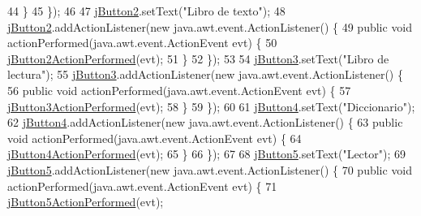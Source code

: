 \begin{DoxyCode}
44             \}
45         \});
46 
47         \mbox{\hyperlink{class_interfaz_package_1_1_interfaz_alta_a1657bb8744ea591f1eb9e70c5c570169}{jButton2}}.setText(\textcolor{stringliteral}{"Libro de texto"});
48         \mbox{\hyperlink{class_interfaz_package_1_1_interfaz_alta_a1657bb8744ea591f1eb9e70c5c570169}{jButton2}}.addActionListener(\textcolor{keyword}{new} java.awt.event.ActionListener() \{
49             \textcolor{keyword}{public} \textcolor{keywordtype}{void} actionPerformed(java.awt.event.ActionEvent evt) \{
50                 \mbox{\hyperlink{class_interfaz_package_1_1_interfaz_alta_ae07fdac3530bdd87b8a2c9ca7705ea61}{jButton2ActionPerformed}}(evt);
51             \}
52         \});
53 
54         \mbox{\hyperlink{class_interfaz_package_1_1_interfaz_alta_a2bce273c449eda774b687351d594071c}{jButton3}}.setText(\textcolor{stringliteral}{"Libro de lectura"});
55         \mbox{\hyperlink{class_interfaz_package_1_1_interfaz_alta_a2bce273c449eda774b687351d594071c}{jButton3}}.addActionListener(\textcolor{keyword}{new} java.awt.event.ActionListener() \{
56             \textcolor{keyword}{public} \textcolor{keywordtype}{void} actionPerformed(java.awt.event.ActionEvent evt) \{
57                 \mbox{\hyperlink{class_interfaz_package_1_1_interfaz_alta_a2f5ffffe991863a26854f54c1f62dbad}{jButton3ActionPerformed}}(evt);
58             \}
59         \});
60 
61         \mbox{\hyperlink{class_interfaz_package_1_1_interfaz_alta_a1766bf9cf73dcb04fa55a88750a864f5}{jButton4}}.setText(\textcolor{stringliteral}{"Diccionario"});
62         \mbox{\hyperlink{class_interfaz_package_1_1_interfaz_alta_a1766bf9cf73dcb04fa55a88750a864f5}{jButton4}}.addActionListener(\textcolor{keyword}{new} java.awt.event.ActionListener() \{
63             \textcolor{keyword}{public} \textcolor{keywordtype}{void} actionPerformed(java.awt.event.ActionEvent evt) \{
64                 \mbox{\hyperlink{class_interfaz_package_1_1_interfaz_alta_a11278134da20d54ada1b395cba82595a}{jButton4ActionPerformed}}(evt);
65             \}
66         \});
67 
68         \mbox{\hyperlink{class_interfaz_package_1_1_interfaz_alta_a368946c13229a442a7633f37c8fa0425}{jButton5}}.setText(\textcolor{stringliteral}{"Lector"});
69         \mbox{\hyperlink{class_interfaz_package_1_1_interfaz_alta_a368946c13229a442a7633f37c8fa0425}{jButton5}}.addActionListener(\textcolor{keyword}{new} java.awt.event.ActionListener() \{
70             \textcolor{keyword}{public} \textcolor{keywordtype}{void} actionPerformed(java.awt.event.ActionEvent evt) \{
71                 \mbox{\hyperlink{class_interfaz_package_1_1_interfaz_alta_a6716900585168bc0e5176c89fe07efa7}{jButton5ActionPerformed}}(evt);

\end{DoxyCode}
